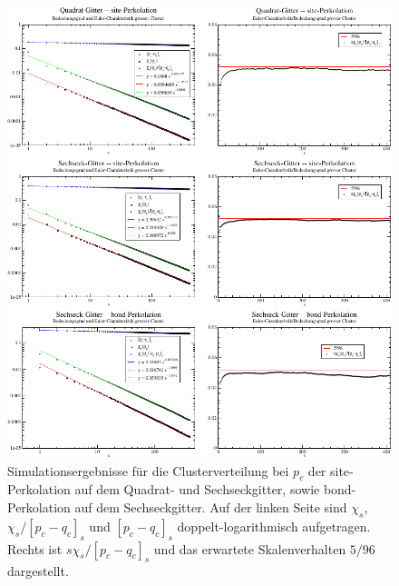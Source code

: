 \begin{figure}[htbp]
  \centering
  \includegraphics{./Schranken-figs/scalinglimit}
  \caption{Simulationsergebnisse f\"ur die Clusterverteilung bei $p_c$ der site-Perkolation auf dem Quadrat- und Sechseckgitter, sowie bond-Perkolation auf dem Sechseckgitter. Auf der linken Seite sind $\chi_s$, $\chi_s/[p_c-q_c]_s$ und $[p_c-q_c]_s$ doppelt-logarithmisch aufgetragen. Rechts  ist $s\chi_s/[p_c-q_c]_s$ und das erwartete Skalenverhalten $5/96$ dargestellt.}
  \label{fig:scalinglimit}
\end{figure}

